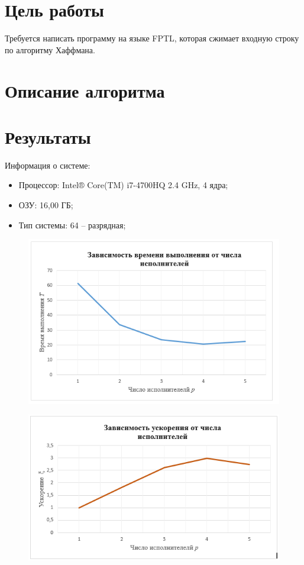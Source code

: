 	\section{Цель работы}
		Требуется написать программу на языке FPTL, которая сжимает входную строку по алгоритму Хаффмана. 
	\section{Описание алгоритма}
		
	\section{Результаты}
		Информация о системе:
		\begin{itemize}
			\item Процессор: Intel® Core(TM) i7-4700HQ 2.4 GHz, 4 ядра;
			\item ОЗУ: 16,00 ГБ;
			\item Тип системы: 64 – разрядная;
		\end{itemize}

		\begin{figure}[h]
			\centering
			\includegraphics[width=1\linewidth]{images/time}
			\label{fig:time}
		\end{figure}
		\begin{figure}[h]
			\centering
			\includegraphics[width=1\linewidth]{images/acceleration}
			\label{fig:acceleration}
		\end{figure}
